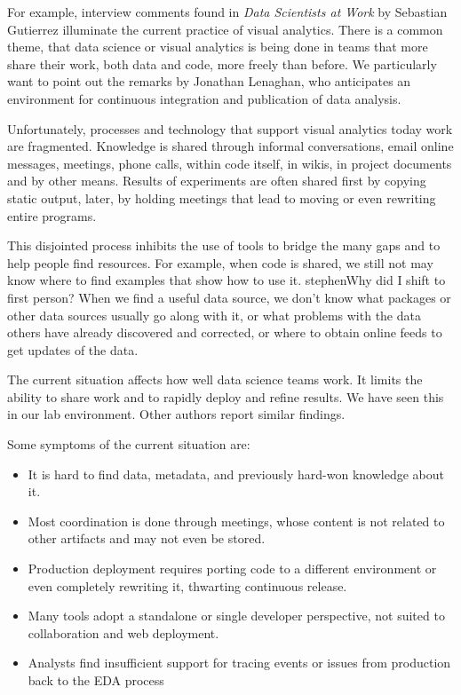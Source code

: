 For example, interview comments found in {\it Data Scientists at Work}
by Sebastian Gutierrez illuminate the current practice of visual analytics.
There is a common theme, that data science or visual analytics is 
being done in teams that more share their work, both data and code,
more freely than before. We particularly want to point out the remarks
by Jonathan Lenaghan, who anticipates an environment for continuous
integration and publication of data analysis.

\begin{addmargin}[1em]{1em}  %
\small

\end{addmargin}


Unfortunately, processes and technology that support visual analytics today
work are fragmented.
Knowledge is shared through informal conversations, email online messages,
meetings, phone calls, within code itself, in wikis, in project documents and
by other means. Results of experiments are often shared first by copying static
output, later, by holding meetings that lead to moving or even rewriting
entire programs.

This disjointed process inhibits the use of tools to bridge
the many gaps and to help people find resources.
For example, when code is shared, we still not may know where to find examples
that show how to use it. stephen{Why did I shift to first person?}
When we find a useful data source, we don't know what packages or
other data sources usually go along with it, or what problems with the data
others have already discovered and corrected, or where to obtain online feeds
to get updates of the data.

The current situation affects how well data science teams work. It limits
the ability to share work and to rapidly deploy and refine results.
We have seen this in our lab environment.
Other authors report similar findings.

Some symptoms of the current situation are:
\begin{itemize}
\item It is hard to find data, metadata, and previously hard-won knowledge about it.
\item Most coordination is done through meetings, whose content is not related to other artifacts and may not even be stored.
\item Production deployment requires porting code to a different environment or even completely rewriting it, thwarting continuous release.
\item Many tools adopt a standalone or single developer perspective,
not suited to collaboration and web deployment. 
\item Analysts find insufficient support for tracing events or issues from production back to the EDA process
\end{itemize}

